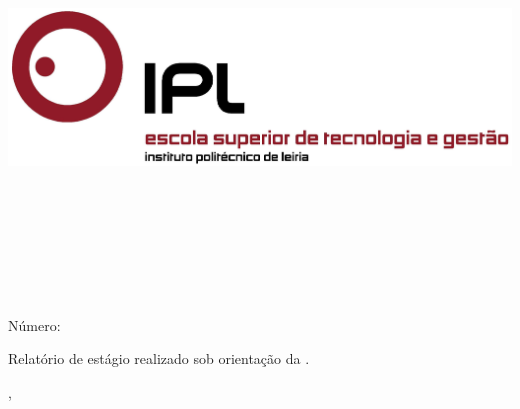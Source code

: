 
\begin{titlepage}

\begin{center}

\hfill

\includegraphics[width=\textwidth]{Covers/estg_h.png} \\

\bigskip
\large
\myFaculty \\
\mySchool \\ 
\myDepartment \\
\myDegree \\



\begingroup
\color{Maroon}

\vspace{4cm}

\spacedallcaps{\myTitle} \\ \bigskip %
\endgroup

\vspace{4cm}



\spacedlowsmallcaps{\myNameOne}\\
Número: \myNumber \\
\bigskip %

\vfill

\end{center}

\begin{normalsize}
    
    \noindent Relatório de estágio realizado sob orientação da \myProfOne.

\end{normalsize}
\vspace{1cm}

\begin{center}

\myLocation, \myTime\ %
    
\end{center}




\end{titlepage}

\cleardoublepage

